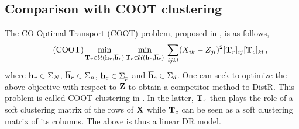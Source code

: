 \subsection{Comparison with COOT clustering}\label{sec:coot_exp}

The CO-Optimal-Transport (COOT) problem, proposed in \citep{redko2020co}, is as follows,
\begin{align}\tag{COOT}
	\label{eq:coot_pb}
	\min_{{\mathbf{T}}_r \in {\mathcal{U}}({\mathbf{h}}_r, \overline{{\mathbf{h}}}_r)} \min_{ {\mathbf{T}}_c \in {\mathcal{U}}({\mathbf{h}}_c, \overline{{\mathbf{h}}}_c)} \: \sum_{ijkl} (X_{ik} - Z_{jl})^2 [{\mathbf{T}}_r]_{ij} [{\mathbf{T}}_c]_{kl} \,,
\end{align}
where ${\mathbf{h}}_r \in \Sigma_N$, $\overline{{\mathbf{h}}}_r \in \Sigma_n$, ${\mathbf{h}}_c \in \Sigma_p$ and $\overline{{\mathbf{h}}}_c \in \Sigma_d$. 
One can seek to optimize the above objective with respect to ${\mathbf{Z}}$ to obtain a competitor method to DistR. This problem is called COOT clustering in \citep{redko2020co}. In the latter, ${\mathbf{T}}_r$ then plays the role of a soft clustering matrix of the rows of ${\mathbf{X}}$ while ${\mathbf{T}}_c$ can be seen as a soft clustering matrix of its columns. The above is thus a linear DR model.


